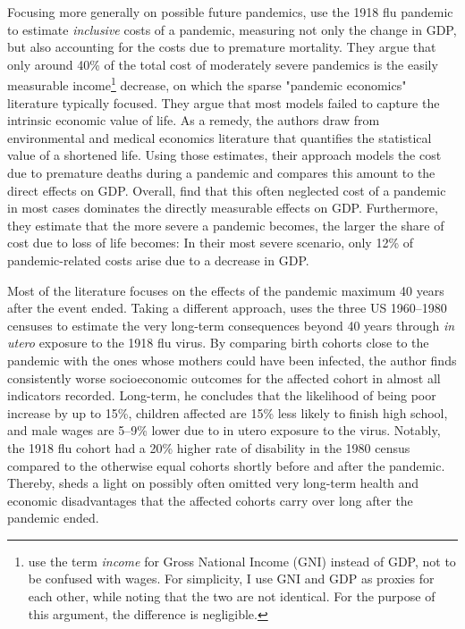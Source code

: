 \documentclass[12pt,a4paper]{article}
\begin{document}
Focusing more generally on possible future pandemics, \cite{fanInclusiveCostPandemic2016} use the 1918 flu pandemic to estimate \textit{inclusive} costs of a pandemic, measuring not only the change in GDP, but also accounting for the costs due to premature mortality.
They argue that only around 40\% of the total cost of moderately severe pandemics is the easily measurable income\footnote{\cite{fanInclusiveCostPandemic2016} use the term \textit{income} for Gross National Income (GNI) instead of GDP, not to be confused with wages. For simplicity, I use GNI and GDP as proxies for each other, while noting that the two are not identical. For the purpose of this argument, the difference is negligible.}
decrease, on which the sparse "pandemic economics" literature typically focused.
They argue that most models failed to capture the intrinsic economic value of life.
As a remedy, the authors draw from environmental and medical economics literature that quantifies the statistical value of a shortened life.
Using those estimates, their approach models the cost due to premature deaths during a pandemic and compares this amount to the direct effects on GDP.
Overall, \cite{fanInclusiveCostPandemic2016} find that this often neglected cost of a pandemic in most cases dominates the directly measurable effects on GDP.
Furthermore, they estimate that the more severe a pandemic becomes, the larger the share of cost due to loss of life becomes: In their most severe scenario, only 12\% of pandemic-related costs arise due to a decrease in GDP.

Most of the literature focuses on the effects of the pandemic maximum 40 years after the event ended.
Taking a different approach, \cite{almond1918InfluenzaPandemic2006} uses the three US 1960--1980 censuses to estimate the very long-term consequences beyond 40 years through \textit{in utero} exposure to the 1918 flu virus.
By comparing birth cohorts close to the pandemic with the ones whose mothers could have been infected, the author finds consistently worse socioeconomic outcomes for the affected cohort in almost all indicators recorded.
Long-term, he concludes that the likelihood of being poor increase by up to 15\%, children affected are 15\% less likely to finish high school, and male wages are 5--9\% lower due to in utero exposure to the virus.
Notably, the 1918 flu cohort had a 20\% higher rate of disability in the 1980 census compared to the otherwise equal cohorts shortly before and after the pandemic.
Thereby, \cite{almond1918InfluenzaPandemic2006} sheds a light on possibly often omitted very long-term health and economic disadvantages that the affected cohorts carry over long after the pandemic ended.
\end{document}
